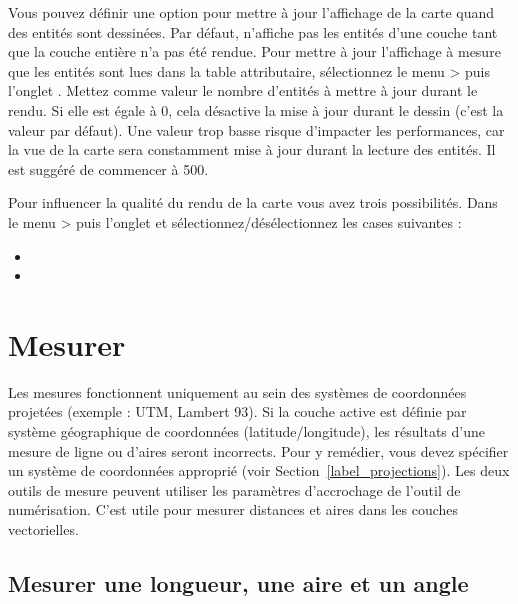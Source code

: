 Vous pouvez définir une option pour mettre à jour l'affichage de la carte quand des entités sont dessinées. Par défaut, \qg n'affiche pas les entités d'une couche tant que la couche entière n'a pas été rendue. Pour mettre à jour l'affichage à mesure que les entités sont lues dans la table attributaire, sélectionnez le menu  >  puis l'onglet . Mettez comme valeur le nombre d'entités à mettre à jour durant le rendu. Si elle est égale à 0, cela désactive la mise à jour durant le dessin (c'est la valeur par défaut). Une valeur trop basse risque d'impacter les performances, car la vue de la carte sera constamment mise à jour durant la lecture des entités. Il est suggéré de commencer à 500.

\label{label_renderquality} 

Pour influencer la qualité du rendu de la carte vous avez trois possibilités. Dans le menu  >  puis l'onglet  et sélectionnez/désélectionnez les cases suivantes :
\begin{itemize}[label=--]
\item {}
\item {}
\end{itemize}

\section{Mesurer} \label{sec:measure} 

Les mesures fonctionnent uniquement au sein des systèmes de coordonnées projetées (exemple : UTM, Lambert 93). Si la couche active est définie par système géographique de coordonnées (latitude/longitude), les résultats d'une mesure de ligne ou d'aires seront incorrects. Pour y remédier, vous devez spécifier un système de coordonnées approprié (voir Section~\ref{label_projections}). Les deux outils de mesure peuvent utiliser les paramètres d'accrochage de l'outil de numérisation. C'est utile pour mesurer distances et aires dans les couches vectorielles.

\subsection{Mesurer une longueur, une aire et un angle}

